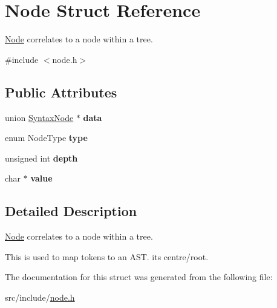 \hypertarget{struct_node}{}\section{Node Struct Reference}
\label{struct_node}


\mbox{\hyperlink{struct_node}{Node}} correlates to a node within a tree.  




{\ttfamily \#include $<$node.\+h$>$}

\subsection*{Public Attributes}
\begin{DoxyCompactItemize}
\item 
\mbox{\label{struct_node_a5fafc290a43e87a4610980c4bf17ccc8}} 
union \mbox{\hyperlink{union_syntax_node}{Syntax\+Node}} $\ast$ {\bfseries data}
\item 
\mbox{\label{struct_node_a6297a673269e91293bc50568e573b686}} 
enum Node\+Type {\bfseries type}
\item 
\mbox{\label{struct_node_ae41eac3cbca43f06a6f8a065215e196b}} 
unsigned int {\bfseries depth}
\item 
\mbox{\label{struct_node_a785f15caf45b9b7aa4984bc72bf4a525}} 
char $\ast$ {\bfseries value}
\end{DoxyCompactItemize}


\subsection{Detailed Description}
\mbox{\hyperlink{struct_node}{Node}} correlates to a node within a tree. 

This is used to map tokens to an A\+ST. its centre/root. 

The documentation for this struct was generated from the following file\+:\begin{DoxyCompactItemize}
\item 
src/include/\mbox{\hyperlink{node_8h}{node.\+h}}\end{DoxyCompactItemize}
